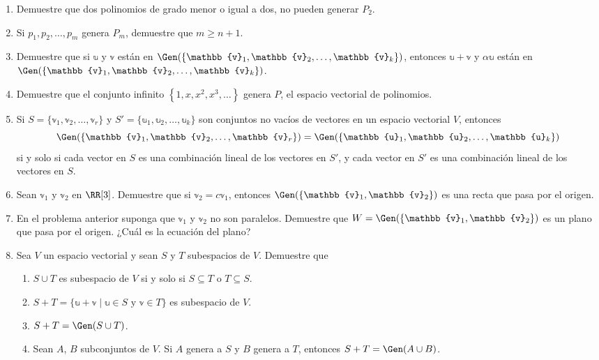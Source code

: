 \begin{enumerate}[start=61]
    \item Demuestre que dos polinomios de grado menor o igual a dos, no pueden generar $P_{2}$.
    \item Si $p_{1}, p_{2}, \dots, p_{m}$ genera $P_{m}$, demuestre que $m \geq n+1$.
    \item Demuestre que si $\mathbb{u}$ y $\mathbb{v}$ están en $\Gen (\{\mathbb{v}_{1}, \mathbb{v}_{2}, \dots, \mathbb{v}_{k}\})$, entonces $\mathbb{u}+\mathbb{v}$ y $\alpha \mathbb{u}$ están en $\Gen (\{\mathbb{v}_{1}, \mathbb{v}_{2}, \dots, \mathbb{v}_{k}\})$.
    \item Demuestre que el conjunto infinito $\left\{1, x, x^{2}, x^{3}, \dots\right\}$ genera $P$, el espacio vectorial de polinomios.
    \item Si $S = \{\mathbb{v}_1, \mathbb{v}_2, \dots, \mathbb{v}_r\}$ y $S' = \{\mathbb{u}_1, \mathbb{u}_2, \dots, \mathbb{u}_k\}$ son conjuntos no vacíos de vectores en un espacio vectorial $V$, entonces
    $$\Gen (\{\mathbb{v}_1, \mathbb{v}_2, \dots, \mathbb{v}_r\}) = \Gen (\{\mathbb{u}_1, \mathbb{u}_2, \dots, \mathbb{u}_k\})$$
    si y solo si cada vector en $S$ es una combinación lineal de los vectores en $S'$, y cada vector en $S'$ es una combinación lineal de los vectores en $S$.
    \item Sean $\mathbb{v}_{1}$ y $\mathbb{v}_{2}$ en $\RR[3]$. Demuestre que si $\mathbb{v}_{2}=c \mathbb{v}_{1}$, entonces $\Gen (\{\mathbb{v}_{1}, \mathbb{v}_{2}\})$ es una recta que pasa por el origen.
    \item En el problema anterior suponga que $\mathbb{v}_{1}$ y $\mathbb{v}_{2}$ no son paralelos. Demuestre que $W= \Gen (\{\mathbb{v}_{1}, \mathbb{v}_{2}\})$ es un plano que pasa por el origen. ¿Cuál es la ecuación del plano?
    \item Sea $V$ un espacio vectorial y sean $S$ y $T$ subespacios de $V$. Demuestre que\label{ejercicio_sumadesubs}
    \begin{enumerate}[label=\roman*)]
        \item $S \cup T$ es subespacio de $V$ si y solo si $S \subseteq T$ o $T \subseteq S$.
        \item $S + T = \{ \mathbb{u} + \mathbb{v} \mid \mathbb{u} \in S \text{ y } \mathbb{v} \in T \}$ es subespacio de $V$.
        \item $S + T = \Gen(S \cup T)$.
        \newpage
        \item Sean $A$, $B$ subconjuntos de $V$. Si $A$ genera a $S$ y $B$ genera a $T$, entonces $S + T = \Gen(A \cup B)$.
    \end{enumerate}
\end{enumerate}
